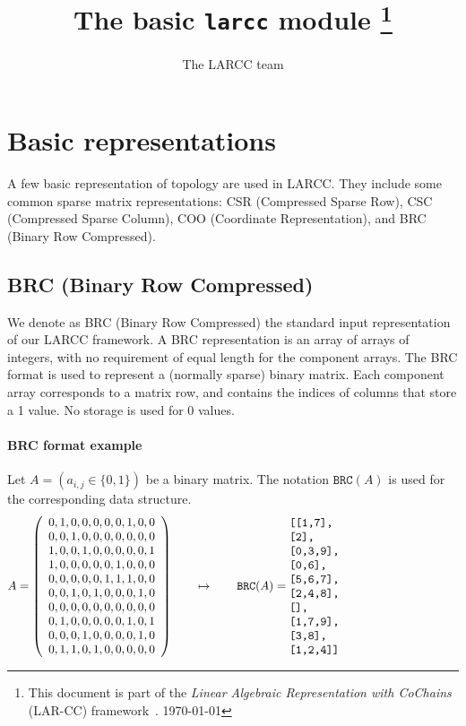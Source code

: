 \documentclass[11pt,oneside]{article}    %
\title{The basic \texttt{larcc} module
\footnote{This document is part of the \emph{Linear Algebraic Representation with CoChains} (LAR-CC) framework~\cite{cclar-proj:2013:00}. \today}
}
\author{The LARCC team}
\def\mat#1{{\left(\begin{array}{cccccccccccccccccccc}#1\end{array}\right)}}
\begin{document}
\maketitle
\nonstopmode

\tableofcontents
\newpage


\section{Basic representations}

A few basic representation of topology are used in LARCC. They include some common sparse matrix representations: CSR (Compressed Sparse Row),  CSC (Compressed Sparse Column),   COO (Coordinate Representation), and BRC (Binary Row Compressed). 

\subsection{BRC (Binary Row Compressed)}

We denote as BRC (Binary Row Compressed) the standard input representation of our LARCC framework. A BRC representation is an array of arrays of integers, with no requirement of equal length for the component arrays. The BRC format is used to represent a (normally sparse) binary matrix. Each component array corresponds to a matrix row, and contains the indices of columns that store a 1 value. No storage is used for 0 values.

\paragraph{BRC format example}

Let $A = (a_{i,j} \in \{0,1\})$ be a binary matrix. The notation $\texttt{BRC}(A)$ is used for the corresponding data structure.
\[
A = \mat{
0,1,0,0,0,0,0,1,0,0\\
0,0,1,0,0,0,0,0,0,0\\
1,0,0,1,0,0,0,0,0,1\\
1,0,0,0,0,0,1,0,0,0\\
0,0,0,0,0,1,1,1,0,0\\
0,0,1,0,1,0,0,0,1,0\\
0,0,0,0,0,0,0,0,0,0\\
0,1,0,0,0,0,0,1,0,1\\
0,0,0,1,0,0,0,0,1,0\\
0,1,1,0,1,0,0,0,0,0\\
}
\qquad\mapsto\qquad \texttt{BRC}(A) =
\begin{minipage}[c]{5cm}
\begin{verbatim}
[[1,7],
 [2],
 [0,3,9],
 [0,6],
 [5,6,7],
 [2,4,8],
 [],
 [1,7,9],
 [3,8],
 [1,2,4]]
\end{verbatim}
\end{minipage}
\]
\end{document}
